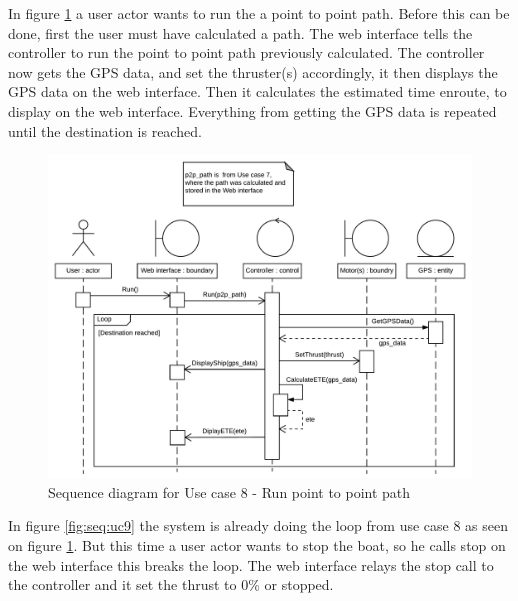 In figure \ref{fig:seq:uc8} a user actor wants to run the a point to point path. Before this can be done, first the user must have calculated a path. The web interface tells the controller to run the point to point path previously calculated. The controller now gets the GPS data, and set the thruster(s) accordingly, it then displays the GPS data on the web interface. Then it calculates the estimated time enroute, to display on the web interface. Everything from getting the GPS data is repeated until the destination is reached.

\begin{figure}[H]
	\centering
	\includegraphics[width=1\linewidth]{Images/System_architecture/Use_case_8_SD}
	\caption{Sequence diagram for Use case 8 - Run point to point path}
	\label{fig:seq:uc8}
\end{figure}

In figure \ref{fig:seq:uc9} the system is already doing the loop from use case 8 as seen on figure \ref{fig:seq:uc8}. But this time a user actor wants to stop the boat, so he calls stop on the web interface this breaks the loop. The web interface relays the stop call to the controller and it set the thrust to 0\% or stopped.

